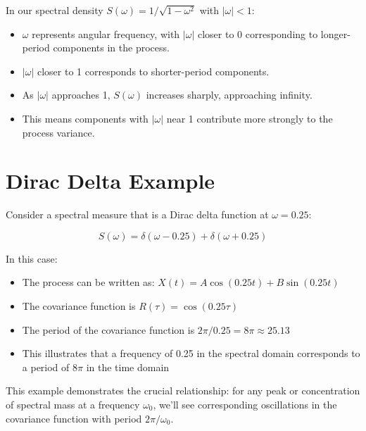\documentclass{article}
\begin{document}
In our spectral density $S(\omega) = 1 / \sqrt{1 - \omega^2}$ with $|\omega| < 1$:

\begin{itemize}
    \item $\omega$ represents angular frequency, with $|\omega|$ closer to 0 corresponding to longer-period components in the process.
    \item $|\omega|$ closer to 1 corresponds to shorter-period components.
    \item As $|\omega|$ approaches 1, $S(\omega)$ increases sharply, approaching infinity.
    \item This means components with $|\omega|$ near 1 contribute more strongly to the process variance.
\end{itemize}

\section{Dirac Delta Example}

Consider a spectral measure that is a Dirac delta function at $\omega = 0.25$:

\[S(\omega) = \delta(\omega - 0.25) + \delta(\omega + 0.25)\]

In this case:

\begin{itemize}
    \item The process can be written as: $X(t) = A \cos(0.25t) + B \sin(0.25t)$
    \item The covariance function is $R(\tau) = \cos(0.25\tau)$
    \item The period of the covariance function is $2\pi/0.25 = 8\pi \approx 25.13$
    \item This illustrates that a frequency of 0.25 in the spectral domain corresponds to a period of $8\pi$ in the time domain
\end{itemize}

This example demonstrates the crucial relationship: for any peak or concentration of spectral mass at a frequency $\omega_0$, we'll see corresponding oscillations in the covariance function with period $2\pi/\omega_0$.
\end{document}
